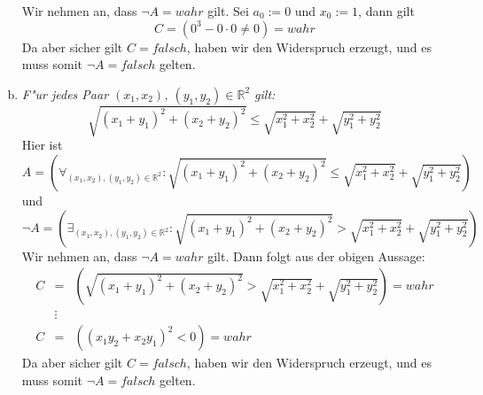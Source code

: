 \begin{enumerate}[a)]
        \pagebreak
        Wir nehmen an, dass $\lnot A = wahr$ gilt. Sei $a_0 := 0$ und $x_0 := 1$, dann gilt
        \begin{equation*}
            C = (0^3 - 0 \cdot 0 \neq 0) = wahr
        \end{equation*}
        Da aber sicher gilt $C = falsch$, haben wir den Widerspruch erzeugt,
        und es muss somit $\lnot A = falsch$ gelten.
    \item \textit{F"ur jedes Paar $(x_1, x_2)$, $(y_1, y_2) \in \mathbb{R}^2$ gilt:}
        \begin{equation*}
            \sqrt{(x_1 + y_1)^2 + (x_2 + y_2)^2} \leq \sqrt{x_1^2 + x_2^2} + \sqrt{y_1^2 + y_2^2}
        \end{equation*}
        Hier ist
        \begin{equation*}
            A = \left(\forall_{(x_1, x_2), (y_1, y_2) \in \mathbb{R}^2} : \sqrt{(x_1 + y_1)^2 + (x_2 + y_2)^2} \leq \sqrt{x_1^2 + x_2^2} + \sqrt{y_1^2 + y_2^2}\right)
        \end{equation*}
        und
        \begin{equation*}
            \lnot A = \left(\exists_{(x_1, x_2), (y_1, y_2) \in \mathbb{R}^2} : \sqrt{(x_1 + y_1)^2 + (x_2 + y_2)^2} > \sqrt{x_1^2 + x_2^2} + \sqrt{y_1^2 + y_2^2}\right)
        \end{equation*}
        Wir nehmen an, dass $\lnot A = wahr$ gilt. Dann folgt aus der obigen Aussage:
        \begin{equation*}
            \begin{array}{rcl}
                C &=& (\sqrt{(x_1 + y_1)^2 + (x_2 + y_2)^2} > \sqrt{x_1^2 + x_2^2} + \sqrt{y_1^2 + y_2^2}) = wahr \\
                  &\vdots& \\
                C &=& ((x_1y_2 + x_2y_1)^2 < 0) = wahr
            \end{array}
        \end{equation*}
        Da aber sicher gilt $C = falsch$, haben wir den Widerspruch erzeugt,
        und es muss somit $\lnot A = falsch$ gelten.
\end{enumerate}

